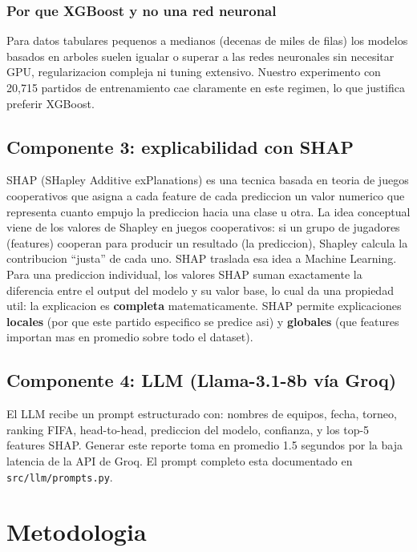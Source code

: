 \documentclass[10pt,twocolumn]{article}
\begin{document}
\subsubsection{Por que XGBoost y no una red neuronal}

Para datos tabulares pequenos a medianos (decenas de miles de filas) los modelos basados en arboles suelen igualar o superar a las redes neuronales sin necesitar GPU, regularizacion compleja ni tuning extensivo. Nuestro experimento con 20,715 partidos de entrenamiento cae claramente en este regimen, lo que justifica preferir XGBoost.

\subsection{Componente 3: explicabilidad con SHAP}

SHAP (SHapley Additive exPlanations) \cite{lundberg2017} es una tecnica basada en teoria de juegos cooperativos que asigna a cada feature de cada prediccion un valor numerico que representa cuanto empujo la prediccion hacia una clase u otra. La idea conceptual viene de los valores de Shapley en juegos cooperativos: si un grupo de jugadores (features) cooperan para producir un resultado (la prediccion), Shapley calcula la contribucion ``justa'' de cada uno. SHAP traslada esa idea a Machine Learning. Para una prediccion individual, los valores SHAP suman exactamente la diferencia entre el output del modelo y su valor base, lo cual da una propiedad util: la explicacion es \textbf{completa} matematicamente. SHAP permite explicaciones \textbf{locales} (por que este partido especifico se predice asi) y \textbf{globales} (que features importan mas en promedio sobre todo el dataset).

\subsection{Componente 4: LLM (Llama-3.1-8b vía Groq)}

El LLM recibe un prompt estructurado con: nombres de equipos, fecha, torneo, ranking FIFA, head-to-head, prediccion del modelo, confianza, y los top-5 features SHAP. Generar este reporte toma en promedio 1.5 segundos por la baja latencia de la API de Groq. El prompt completo esta documentado en \texttt{src/llm/prompts.py}.

\section{Metodologia}
\label{sec:metodo}
\end{document}
